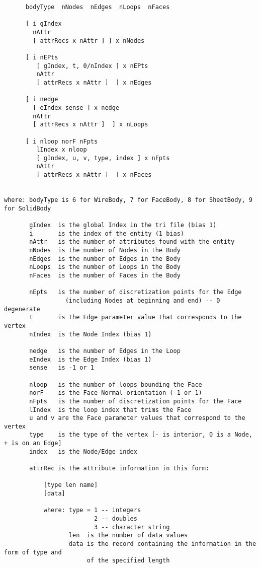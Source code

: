 \documentclass[titlepage]{article}
\begin{document}
\begin{verbatim}
      bodyType  nNodes  nEdges  nLoops  nFaces
      
      [ i gIndex 
        nAttr
        [ attrRecs x nAttr ] ] x nNodes
      
      [ i nEPts
         [ gIndex, t, 0/nIndex ] x nEPts
         nAttr
         [ attrRecs x nAttr ]  ] x nEdges
         
      [ i nedge
        [ eIndex sense ] x nedge
        nAttr
        [ attrRecs x nAttr ]  ] x nLoops
      
      [ i nloop norF nFpts
         lIndex x nloop
         [ gIndex, u, v, type, index ] x nFpts
         nAttr
         [ attrRecs x nAttr ]  ] x nFaces
  
      
where: bodyType is 6 for WireBody, 7 for FaceBody, 8 for SheetBody, 9 for SolidBody

       gIndex  is the global Index in the tri file (bias 1)
       i       is the index of the entity (1 bias)
       nAttr   is the number of attributes found with the entity
       nNodes  is the number of Nodes in the Body
       nEdges  is the number of Edges in the Body
       nLoops  is the number of Loops in the Body
       nFaces  is the number of Faces in the Body
       
       nEpts   is the number of discretization points for the Edge 
                 (including Nodes at beginning and end) -- 0 degenerate
       t       is the Edge parameter value that corresponds to the vertex
       nIndex  is the Node Index (bias 1)
       
       nedge   is the number of Edges in the Loop
       eIndex  is the Edge Index (bias 1)
       sense   is -1 or 1 
       
       nloop   is the number of loops bounding the Face
       norF    is the Face Normal orientation (-1 or 1)
       nFpts   is the number of discretization points for the Face 
       lIndex  is the loop index that trims the Face
       u and v are the Face parameter values that correspond to the vertex
       type    is the type of the vertex [- is interior, 0 is a Node, + is on an Edge]
       index   is the Node/Edge index 
       
       attrRec is the attribute information in this form:
       
           [type len name]
           [data]
       
           where: type = 1 -- integers
                         2 -- doubles
                         3 -- character string
                  len  is the number of data values
                  data is the record containing the information in the form of type and
                       of the specified length
\end{verbatim}
\end{document}

